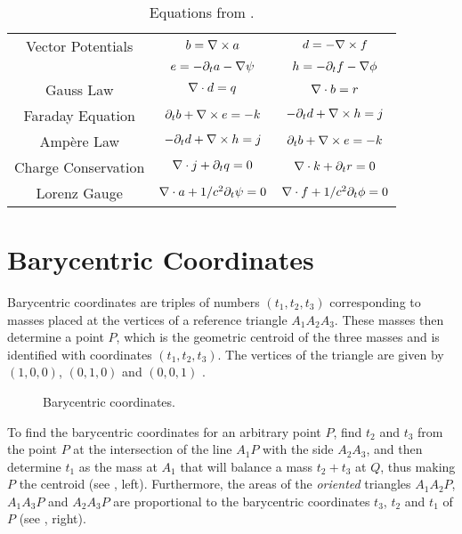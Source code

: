 \begin{table}[htbp]
  \begin{center}
  \begin{tabular}{*{3}{c}}
  \hline
  Vector Potentials   & $b = {\nabla \times a}$ & $d = -{\nabla \times f}$ \\
                      & $e = -\partial_t a - {\nabla \psi}$ & $h = -\partial_t f - {\nabla \phi}$ \\
  Gauss Law           & ${\nabla \cdot d} = q$ & ${\nabla \cdot b} = r$ \\
  Faraday Equation    & $\partial_t b + {\nabla \times e} = -k$ & $-\partial_t d + {\nabla \times h} = j$ \\
  Amp\`ere Law        & $-\partial_t d + {\nabla \times h} = j$ & $\partial_t b + {\nabla \times e} = -k$ \\
  Charge Conservation & ${\nabla \cdot j} + \partial_t q = 0$ & ${\nabla \cdot k} + \partial_t r = 0$ \\
  Lorenz Gauge        & ${\nabla \cdot a} + 1/c^2 \partial_t \psi = 0$ & ${\nabla \cdot f} + 1/c^2 \partial_t \phi = 0$ \\
  \hline
\end{tabular}
\end{center}
\caption{Equations from .}
\label{tab:maxwell_house}
\end{table}


\chapter{Barycentric Coordinates}  \label{app:barycentric}

Barycentric coordinates are triples of numbers $(t_1,t_2,t_3)$
corresponding to masses placed at the vertices of a reference triangle
$A_1A_2A_3$. These masses then determine a point $P$, which is the
geometric centroid of the three masses and is identified with
coordinates $(t_1,t_2,t_3)$. The vertices of the triangle are given by
$(1,0,0)$, $(0,1,0)$ and $(0,0,1)$
\cite{mathworld,coxeter_barycentric}.

\begin{figure}[htbp]
  \begin{center}
    \resizebox{10cm}{!}{}
  \end{center}
  \caption{Barycentric coordinates.}
  \label{fig:barycentric_coordinates}
\end{figure}

To find the barycentric coordinates for an arbitrary point $P$, find
$t_2$ and $t_3$ from the point $P$ at the intersection of the line
$A_1P$ with the side $A_2A_3$, and then determine $t_1$ as the mass at
$A_1$ that will balance a mass $t_2+t_3$ at $Q$, thus making $P$ the
centroid (see ,
left). Furthermore, the areas of the \emph{oriented} triangles
$A_1A_2P$, $A_1A_3P$ and $A_2A_3P$ are proportional to the barycentric
coordinates $t_3$, $t_2$ and $t_1$ of $P$ (see
, right).

